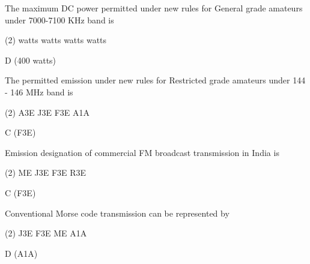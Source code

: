 \documentclass[a4paper]{article}
\begin{document}
\begin{question}The maximum DC power permitted under new rules for General grade amateurs under 7000-7100 KHz band is
	\begin{tasks}(2)
		 watts
		 watts
		 watts
		 watts
	\end{tasks}
\end{question}

\begin{solution}
	D (400 watts)
\end{solution}

\vspace{5mm}



\begin{question}The permitted emission under new rules for Restricted grade amateurs under 144 - 146 MHz band is
	\begin{tasks}(2)
		\task A3E
		\task J3E
		\task F3E
		\task A1A
	\end{tasks}
\end{question}

\begin{solution}
	C (F3E)
\end{solution}

\vspace{5mm}


\begin{question}Emission designation of commercial FM broadcast transmission in India is
	\begin{tasks}(2)
		\task ME
		\task J3E
		\task F3E
		\task R3E
	\end{tasks}
\end{question}

\begin{solution}
	C (F3E)
\end{solution}

\vspace{5mm}



\begin{question}Conventional Morse code transmission can be represented by
	\begin{tasks}(2)
		\task J3E
		\task F3E
		\task ME
		\task A1A
	\end{tasks}
\end{question}

\begin{solution}
	D (A1A)
\end{solution}
\end{document}
